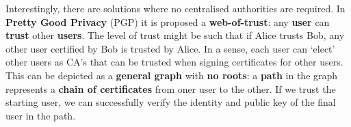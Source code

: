 Interestingly, there are solutions where no centralised authorities are required. In \textbf{Pretty Good Privacy} (PGP) it is proposed a \textbf{web-of-trust}: any \textbf{user} can \textbf{trust} other \textbf{users}. The level of trust might be such that if Alice trusts Bob, any other user certified by Bob is trusted by Alice. In a sense, each user can ‘elect’ other users as CA’s that can be trusted when signing certificates for other users. This can be depicted as a \textbf{general graph} with \textbf{no roots}: a \textbf{path} in the graph represents a \textbf{chain of certificates} from oner user to the other. If we trust the starting user, we can successfully verify the identity and public key of the final user in the path.

